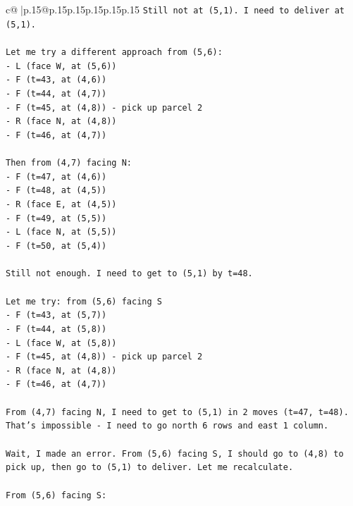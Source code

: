 \documentclass{article}
\begin{document}
{\begin{supertabular}{c@{$\;$}|p{.15\linewidth}@{}p{.15\linewidth}p{.15\linewidth}p{.15\linewidth}p{.15\linewidth}p{.15\linewidth}}
{{{\texttt{Still not at (5,1). I need to deliver at (5,1).} \\
\\ 
\texttt{Let me try a different approach from (5,6):} \\
\texttt{{-} L (face W, at (5,6))} \\
\texttt{{-} F (t=43, at (4,6))} \\
\texttt{{-} F (t=44, at (4,7))} \\
\texttt{{-} F (t=45, at (4,8)) {-} pick up parcel 2} \\
\texttt{{-} R (face N, at (4,8))} \\
\texttt{{-} F (t=46, at (4,7))} \\
\\ 
\texttt{Then from (4,7) facing N:} \\
\texttt{{-} F (t=47, at (4,6))} \\
\texttt{{-} F (t=48, at (4,5))} \\
\texttt{{-} R (face E, at (4,5))} \\
\texttt{{-} F (t=49, at (5,5))} \\
\texttt{{-} L (face N, at (5,5))} \\
\texttt{{-} F (t=50, at (5,4))} \\
\\ 
\texttt{Still not enough. I need to get to (5,1) by t=48.} \\
\\ 
\texttt{Let me try: from (5,6) facing S} \\
\texttt{{-} F (t=43, at (5,7))} \\
\texttt{{-} F (t=44, at (5,8))} \\
\texttt{{-} L (face W, at (5,8))} \\
\texttt{{-} F (t=45, at (4,8)) {-} pick up parcel 2} \\
\texttt{{-} R (face N, at (4,8))} \\
\texttt{{-} F (t=46, at (4,7))} \\
\\ 
\texttt{From (4,7) facing N, I need to get to (5,1) in 2 moves (t=47, t=48). That's impossible {-} I need to go north 6 rows and east 1 column.} \\
\\ 
\texttt{Wait, I made an error. From (5,6) facing S, I should go to (4,8) to pick up, then go to (5,1) to deliver. Let me recalculate.} \\
\\ 
\texttt{From (5,6) facing S:} \\
}}}
\end{supertabular}}
\end{document}
